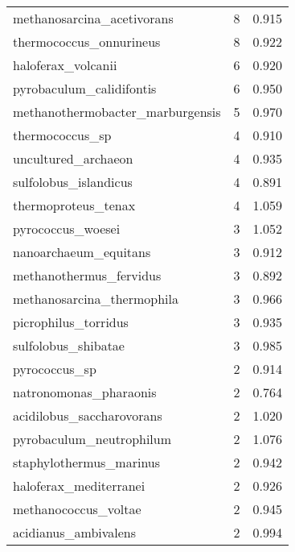 \begin{tabular}{lrr}
             methanosarcina\_acetivorans &                   8 &     0.915 \\
                thermococcus\_onnurineus &                   8 &     0.922 \\
                     haloferax\_volcanii &                   6 &     0.920 \\
               pyrobaculum\_calidifontis &                   6 &     0.950 \\
       methanothermobacter\_marburgensis &                   5 &     0.970 \\
                        thermococcus\_sp &                   4 &     0.910 \\
                    uncultured\_archaeon &                   4 &     0.935 \\
                  sulfolobus\_islandicus &                   4 &     0.891 \\
                    thermoproteus\_tenax &                   4 &     1.059 \\
                      pyrococcus\_woesei &                   3 &     1.052 \\
                  nanoarchaeum\_equitans &                   3 &     0.912 \\
                methanothermus\_fervidus &                   3 &     0.892 \\
             methanosarcina\_thermophila &                   3 &     0.966 \\
                   picrophilus\_torridus &                   3 &     0.935 \\
                    sulfolobus\_shibatae &                   3 &     0.985 \\
                          pyrococcus\_sp &                   2 &     0.914 \\
                 natronomonas\_pharaonis &                   2 &     0.764 \\
              acidilobus\_saccharovorans &                   2 &     1.020 \\
               pyrobaculum\_neutrophilum &                   2 &     1.076 \\
                staphylothermus\_marinus &                   2 &     0.942 \\
                 haloferax\_mediterranei &                   2 &     0.926 \\
                   methanococcus\_voltae &                   2 &     0.945 \\
                   acidianus\_ambivalens &                   2 &     0.994 \\

\end{tabular}
